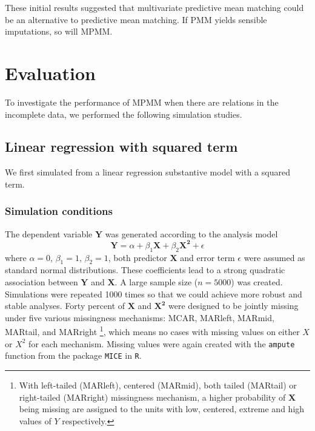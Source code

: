 	These initial results suggested that multivariate predictive mean matching could be an alternative to predictive mean matching. If PMM yields sensible imputations, so will MPMM.
	
	\section{Evaluation}
	\label{sec:3.4}
	To investigate the performance of MPMM when there are relations in the incomplete data, we performed the following simulation studies. 
	
	\subsection{Linear regression with squared term}
	\label{sec:3.4.1}
	We first simulated from a linear regression substantive model with a squared term. 
	\subsubsection{Simulation conditions}
	The dependent variable $\boldsymbol{Y}$ was generated according to the analysis model
	\begin{equation}
		\boldsymbol{Y} = \alpha + \beta_1\boldsymbol{X} + \beta_2 \boldsymbol{X^2} + \epsilon
	\end{equation}
	where $\alpha=0$, $\beta_1=1$, $\beta_2=1$, both predictor $\boldsymbol{X}$ and error term $\epsilon$ were assumed as standard normal distributions. These coefficients lead to a strong quadratic association between $\boldsymbol{Y}$ and $\boldsymbol{X}$. A large sample size ($n=5000$) was created. Simulations were repeated 1000 times so that we could achieve more robust and stable analyses. Forty percent of $\boldsymbol{X}$ and $\boldsymbol{X^2}$ were designed to be jointly missing under five various missingness mechanisms: MCAR, MARleft, MARmid, MARtail, and MARright \footnote[1]{With left-tailed (MARleft), centered (MARmid), both tailed (MARtail) or right-tailed (MARright) missingness mechanism, a higher probability of $\boldsymbol{X}$ being missing are assigned to the units with low, centered, extreme and high values of $Y$ respectively.}, which means no cases with missing values on either $X$ or $X^2$ for each mechanism. Missing values were again created with the \texttt{ampute} function from the package \texttt{MICE} in \texttt{R}.
	
